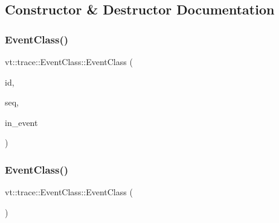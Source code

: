 \subsection{Constructor \& Destructor Documentation}
\mbox{\label{structvt_1_1trace_1_1_event_class_ac9ec736933394fb09a42abf600d691a8}} 
\subsubsection{\texorpdfstring{Event\+Class()}{EventClass()}\hspace{0.1cm}{\footnotesize\ttfamily [1/3]}}
{\footnotesize\ttfamily vt\+::trace\+::\+Event\+Class\+::\+Event\+Class (\begin{DoxyParamCaption}\item[{\hyperlink{namespacevt_1_1trace_a3c14050715ba9eceaeff51fb3de64f2f}{Trace\+Entry\+I\+D\+Type}}]{id,  }\item[{\hyperlink{namespacevt_1_1trace_a522028dd2a7d056f0ec3d417836fdecd}{Trace\+Entry\+Seq\+Type}}]{seq,  }\item[{std\+::string const \&}]{in\+\_\+event }\end{DoxyParamCaption})}

\mbox{\label{structvt_1_1trace_1_1_event_class_a50a0237b8fa6d512720b3aa3830ae30a}} 
\subsubsection{\texorpdfstring{Event\+Class()}{EventClass()}\hspace{0.1cm}{\footnotesize\ttfamily [2/3]}}
{\footnotesize\ttfamily vt\+::trace\+::\+Event\+Class\+::\+Event\+Class (\begin{DoxyParamCaption}\item[{\hyperlink{structvt_1_1trace_1_1_event_class}{Event\+Class} const \&}]{ }\end{DoxyParamCaption})\hspace{0.3cm}{\ttfamily [default]}}

